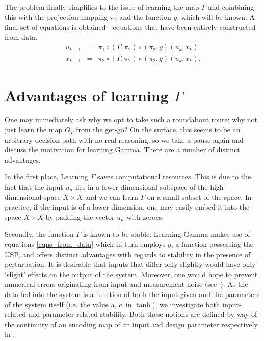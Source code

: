 \documentclass[a4paper,12pt,twoside]{report}
\begin{document}
The problem finally simplifies to the issue of learning the map $\Gamma$ and combining this with the projection mapping $\pi_2$ and the function $g$, which will be known. A final set of equations is obtained - equations that have been entirely constructed from data.
\begin{eqnarray}\label{eqns_from_data}
	u_{k+1} &=& \pi_1 \circ (\Gamma, \pi_2) \circ (\pi_2,g) (u_k,x_k) \label{Seqn_u}\\
	x_{k+1} &=& \pi_2 \circ (\Gamma, \pi_2) \circ (\pi_2,g) (u_k,x_k). \label{Seqn_x}
\end{eqnarray}



\section{Advantages of learning $\Gamma$} \label{subs_LearnGamma}

One may immediately ask why we opt to take such a roundabout route; why not just learn the map $G_T$ from the get-go? On the surface, this seems to be an arbitrary decision path with no real reasoning, so we take a pause again and discuss the motivation for learning Gamma.
There are a number of distinct advantages. 

In the first place, Learning $\Gamma$ saves computational resources. This is due to the fact that the input $u_n$ lies in a lower-dimensional subspace of the high-dimensional space $X\times{X}$ and we can learn $\Gamma$ on a small subset of the space. In practice, if the input is of a  lower dimension, one may easily embed it into the space $X\times{X}$ by padding the vector $u_n$ with zeroes.

Secondly, the function $\Gamma$ is known to be stable. Learning Gamma makes use of equations \ref{eqns_from_data} which in turn employs $g$, a function possessing the USP, and offers distinct advantages with regards to stability in the presence of perturbation. It is desirable that inputs that differ only slightly would have only ‘slight’ effects on the output of the system. Moreover, one would hope to prevent numerical errors originating from input and measurement noise (see~\cite[Th. 5]{manjunath2021universal}). 
As the data fed into the system is a function of both the input given and the parameters of the system itself (i.e. the value a, $\alpha$ in $\tanh$), we investigate both input-related and parameter-related stability. Both these notions are defined by way of the continuity of an encoding map of an input and design parameter respectively in \cite{manjunath2020stability}.\
\end{document}
